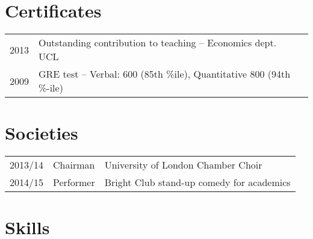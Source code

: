 \documentclass[a4paper,nomath]{deedy-resume} %
\begin{document}
\begin{paracol}{2}
    \sectionspace %

    \section{Certificates} 

    \begin{tabular}{rll}
        2013	 & Outstanding contribution to teaching -- Economics dept. UCL\\
        2009     & GRE test -- Verbal: 600 (85th \%ile), Quantitative 800 (94th \%-ile) \\
    \end{tabular}

    \sectionspace %


    \section{Societies} 

    \begin{tabular}{rll}
        2013/14 & Chairman & University of London Chamber Choir\\
        2014/15 & Performer & Bright Club stand-up comedy for academics\\
    \end{tabular}

    \sectionspace %


\switchcolumn
%


    \section{Skills}


\end{paracol}
\end{document}
